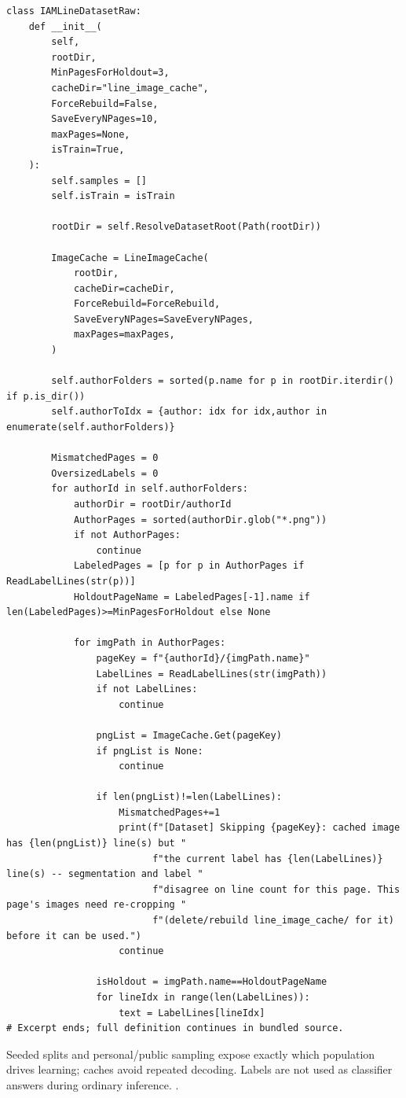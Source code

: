\begin{lstlisting}[style=plain]
class IAMLineDatasetRaw:
    def __init__(
        self,
        rootDir,
        MinPagesForHoldout=3,
        cacheDir="line_image_cache",
        ForceRebuild=False,
        SaveEveryNPages=10,
        maxPages=None,
        isTrain=True,
    ):
        self.samples = []
        self.isTrain = isTrain

        rootDir = self.ResolveDatasetRoot(Path(rootDir))

        ImageCache = LineImageCache(
            rootDir,
            cacheDir=cacheDir,
            ForceRebuild=ForceRebuild,
            SaveEveryNPages=SaveEveryNPages,
            maxPages=maxPages,
        )

        self.authorFolders = sorted(p.name for p in rootDir.iterdir() if p.is_dir())
        self.authorToIdx = {author: idx for idx,author in enumerate(self.authorFolders)}

        MismatchedPages = 0
        OversizedLabels = 0
        for authorId in self.authorFolders:
            authorDir = rootDir/authorId
            AuthorPages = sorted(authorDir.glob("*.png"))
            if not AuthorPages:
                continue
            LabeledPages = [p for p in AuthorPages if ReadLabelLines(str(p))]
            HoldoutPageName = LabeledPages[-1].name if len(LabeledPages)>=MinPagesForHoldout else None

            for imgPath in AuthorPages:
                pageKey = f"{authorId}/{imgPath.name}"
                LabelLines = ReadLabelLines(str(imgPath))
                if not LabelLines:
                    continue

                pngList = ImageCache.Get(pageKey)
                if pngList is None:
                    continue

                if len(pngList)!=len(LabelLines):
                    MismatchedPages+=1
                    print(f"[Dataset] Skipping {pageKey}: cached image has {len(pngList)} line(s) but "
                          f"the current label has {len(LabelLines)} line(s) -- segmentation and label "
                          f"disagree on line count for this page. This page's images need re-cropping "
                          f"(delete/rebuild line_image_cache/ for it) before it can be used.")
                    continue

                isHoldout = imgPath.name==HoldoutPageName
                for lineIdx in range(len(LabelLines)):
                    text = LabelLines[lineIdx]
# Excerpt ends; full definition continues in bundled source.
\end{lstlisting}
Seeded splits and personal/public sampling expose exactly which population drives learning; caches avoid repeated decoding. Labels are not used as classifier answers during ordinary inference. \cite{marti2002,code2026,torchdata}.


